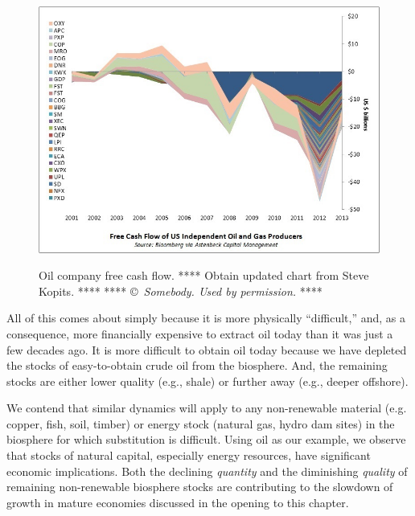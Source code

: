 \begin{figure}[!ht]
\centering\
\includegraphics[width=\linewidth]{Part_0/Chapter_Introduction/images/Cash-Flow.jpg}
\caption[Oil company free cash flow]{Oil company free cash flow.\cite{Kopits:2014aa}
**** Obtain updated chart from Steve Kopits. ****
**** \copyright~\emph{Somebody. Used by permission.} ****}
\label{fig:oil_company_free_cash_flow}
\end{figure}

All of this comes about simply because it is 
more physically ``difficult,'' and, as a consequence, 
more financially expensive
to extract oil today than it was just a few decades ago.
It is more difficult to obtain oil today because we have depleted
the stocks of easy-to-obtain crude oil from the biosphere.
And, the remaining stocks are either lower quality (e.g., shale)
or further away (e.g., deeper offshore).

We contend that similar dynamics will apply to 
any non-renewable material (e.g. copper, fish, soil, timber) 
or energy stock (natural gas, hydro dam sites)
in the biosphere
for which substitution is difficult.
Using oil as our example, we observe that 
stocks of natural capital, especially energy resources,
have significant economic implications.
Both the declining \emph{quantity} and 
the diminishing \emph{quality} of remaining non-renewable biosphere stocks 
are contributing to the slowdown of growth in mature economies
discussed in the opening to this chapter.

